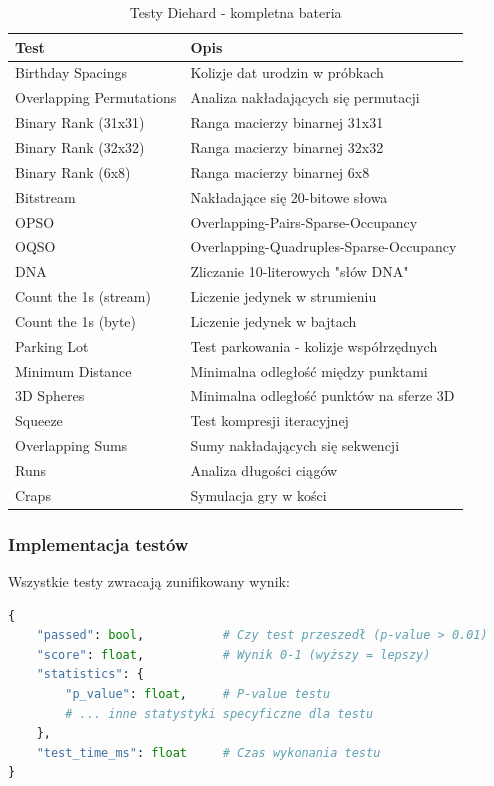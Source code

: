 \documentclass[12pt,a4paper]{article}
\begin{document}
\begin{table}[H]
\centering
\caption{Testy Diehard - kompletna bateria}
\begin{tabular}{|l|p{7cm}|}
\hline
\textbf{Test} & \textbf{Opis} \\
\hline
Birthday Spacings & Kolizje dat urodzin w próbkach \\
\hline
Overlapping Permutations & Analiza nakładających się permutacji \\
\hline
Binary Rank (31x31) & Ranga macierzy binarnej 31x31 \\
\hline
Binary Rank (32x32) & Ranga macierzy binarnej 32x32 \\
\hline
Binary Rank (6x8) & Ranga macierzy binarnej 6x8 \\
\hline
Bitstream & Nakładające się 20-bitowe słowa \\
\hline
OPSO & Overlapping-Pairs-Sparse-Occupancy \\
\hline
OQSO & Overlapping-Quadruples-Sparse-Occupancy \\
\hline
DNA & Zliczanie 10-literowych "słów DNA" \\
\hline
Count the 1s (stream) & Liczenie jedynek w strumieniu \\
\hline
Count the 1s (byte) & Liczenie jedynek w bajtach \\
\hline
Parking Lot & Test parkowania - kolizje współrzędnych \\
\hline
Minimum Distance & Minimalna odległość między punktami \\
\hline
3D Spheres & Minimalna odległość punktów na sferze 3D \\
\hline
Squeeze & Test kompresji iteracyjnej \\
\hline
Overlapping Sums & Sumy nakładających się sekwencji \\
\hline
Runs & Analiza długości ciągów \\
\hline
Craps & Symulacja gry w kości \\
\hline
\end{tabular}
\end{table}

\subsubsection{Implementacja testów}

Wszystkie testy zwracają zunifikowany wynik:

\begin{lstlisting}[language=Python, caption=Struktura wyniku testu]
{
    "passed": bool,           # Czy test przeszedł (p-value > 0.01)
    "score": float,           # Wynik 0-1 (wyższy = lepszy)
    "statistics": {
        "p_value": float,     # P-value testu
        # ... inne statystyki specyficzne dla testu
    },
    "test_time_ms": float     # Czas wykonania testu
}
\end{lstlisting}
\end{document}
